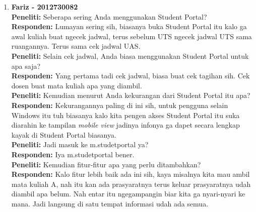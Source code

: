 \begin{enumerate}
	\item\textbf{Fariz - 2012730082}\\
	\textbf{Peneliti:} Seberapa sering Anda menggunakan Student Portal?\\
	\textbf{Responden:} Lumayan sering sih, biasanya buka Student Portal itu kalo ga awal kuliah buat ngecek jadwal, terus sebelum UTS ngecek jadwal UTS sama ruangannya. Terus sama cek jadwal UAS.\\
	\textbf{Peneliti:} Selain cek jadwal, Anda biasa menggunakan Student Portal untuk apa saja?\\
	\textbf{Responden:} Yang pertama tadi cek jadwal, biasa buat cek tagihan sih. Cek dosen buat mata kuliah apa yang diambil.\\
	\textbf{Peneliti:} Kemudian menurut Anda kekurangan dari Student Portal itu apa?\\
	\textbf{Responden:} Kekurangannya paling di ini sih, untuk pengguna selain Windows itu tuh biasanya kalo kita pengen akses Student Portal itu suka diarahin ke tampilan \textit{mobile view} jadinya infonya ga dapet secara lengkap kayak di Student Portal biasanya.\\
	\textbf{Peneliti:} Jadi masuk ke m.studetportal ya?\\
	\textbf{Responden:} Iya m.studetportal bener.\\
	\textbf{Peneliti:} Kemudian fitur-fitur apa yang perlu ditambahkan?\\
	\textbf{Responden:} Kalo fitur lebih baik ada ini sih, kaya misalnya kita mau ambil mata kuliah A, nah itu kan ada prasyaratnya terus keluar prasyaratnya udah diambil apa belum. Nah entar itu ngegampangin biar kita ga nyari-nyari ke mana. Jadi langsung di satu tempat informasi udah ada semua.\\
\end{enumerate}



